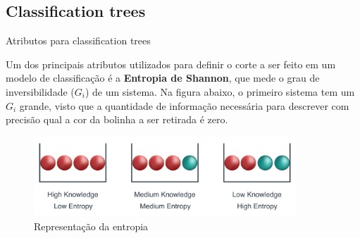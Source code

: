 \documentclass{beamer}
\begin{document}
\subsection{Classification trees}
\begin{frame}{Atributos para classification trees}

    Um dos principais atributos utilizados para definir o corte a ser feito em um modelo de classificação é a \textbf{Entropia de Shannon}, que mede o grau de inversibilidade ($G_i$) de um sistema. Na figura abaixo, o primeiro sistema tem um $G_i$ grande, visto que a quantidade de informação necessária para descrever com precisão qual a cor da bolinha a ser retirada é zero.
    
    \begin{figure}
        \centering
        \includegraphics[height=3cm]{pic/entropy.png}
        
    
    \caption{Representação da entropia}
    \end{figure}

\end{frame}
\end{document}
